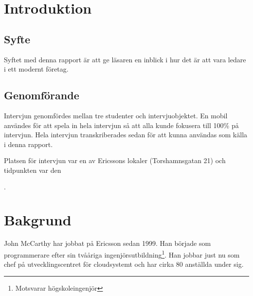 \section{Introduktion}
\subsection{Syfte}
Syftet med denna rapport är att ge läsaren en inblick i hur det är att vara ledare i ett modernt företag.
\subsection{Genomförande}
Intervjun genomfördes mellan tre studenter och intervjuobjektet. En mobil användes för att spela in hela intervjun så att alla kunde fokusera till 100\% på intervjun. Hela intervjun transkriberades sedan för att kunna användas som källa i denna rapport.

Platsen för intervjun var en av Ericssons lokaler (Torshamnsgatan 21) och tidpunkten var den \date{28 april, 2014}.
\section{Bakgrund}
John McCarthy har jobbat på Ericsson sedan 1999. Han började som programmerare efter sin tvååriga ingenjörsutbildning\footnote{Motsvarar högskoleingenjör}. Han jobbar just nu som chef på utvecklingscentret för cloudsystemt och har cirka 80 anställda under sig.